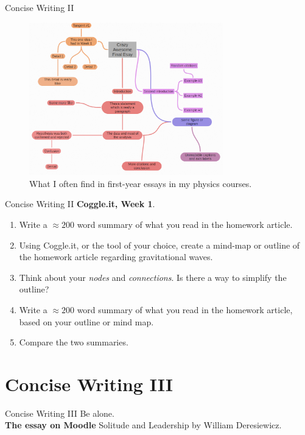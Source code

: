 \documentclass{beamer}
\begin{document}
\begin{frame}{Concise Writing II}
\begin{figure}
\centering
\includegraphics[width=0.75\textwidth]{figures/MindMap3.png}
\caption{\label{fig:mm3} What I often find in first-year essays in my physics courses.}
\end{figure}
\end{frame}

\begin{frame}{Concise Writing II}
\textbf{Coggle.it, Week 1}.
\begin{enumerate}
\item Write a $\approx 200$ word summary of what you read in the homework article.
\item Using Coggle.it, or the tool of your choice, create a mind-map or outline of the homework article regarding gravitational waves.
\item Think about your \textit{nodes} and \textit{connections}.  Is there a way to simplify the outline?
\item Write a $\approx 200$ word summary of what you read in the homework article, based on your outline or mind map.
\item Compare the two summaries.
\end{enumerate}
\end{frame}

\section{Concise Writing III}

\begin{frame}{Concise Writing III}
\small
Be alone. \\ \vspace{0.5cm}
\alert{\textbf{The essay on Moodle} Solitude and Leadership} by William Deresiewicz.
\end{frame}
\end{document}
